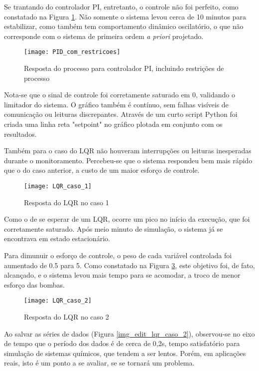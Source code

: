 Se trantando do controlador PI, entretanto, o controle não foi perfeito, como constatado na Figura \ref{img_pid_com_restricoes}. Não somente o sistema levou cerca de 10 minutos para estabilizar, como também tem comportamento dinâmico oscilatório, o que não corresponde com o sistema de primeira ordem \emph{a priori} projetado.

\begin{figure}[htb]
	\centering
	\caption{Resposta do processo para controlador PI, incluindo restrições de processo}
	\texttt{[image: PID\_com\_restricoes]}
	\label{img_pid_com_restricoes}
\end{figure}

Nota-se que o sinal de controle foi corretamente saturado em 0, validando o limitador do sistema. O gráfico também é contínuo, sem falhas visíveis de comunicação ou leituras discrepantes. Através de um curto script Python foi criada uma linha reta "setpoint" no gráfico plotada em conjunto com os resultados.

Também para o caso do LQR não houveram interrupções ou leituras inesperadas durante o monitoramento. Percebeu-se que o sistema respondeu bem mais rápido que o do caso anterior, a custo de um maior esforço de controle.

\begin{figure}[htb]
	\centering
	\caption{Resposta do LQR no caso 1}
	\texttt{[image: LQR\_caso\_1]}
	\label{img_lqr_caso_1}
\end{figure}

Como o de se esperar de um LQR, ocorre um pico no início da execução, que foi corretamente saturado. Após meio minuto de simulação, o sistema já se encontrava em estado estacionário.

Para dimunuir o esforço de controle, o peso de cada variável controlada foi aumentado de 0.5 para 5. Como constatado na Figura \ref{img_lqr_caso_2}, este objetivo foi, de fato, alcançado, e o sistema levou mais tempo para se acomodar, a troco de menor esforço das bombas.

\begin{figure}[htb]
	\centering
	\caption{Resposta do LQR no caso 2}
	\texttt{[image: LQR\_caso\_2]}
	\label{img_lqr_caso_2}
\end{figure}

Ao salvar as séries de dados (Figura \ref{img_edit_lqr_caso_2}), observou-se no eixo de tempo que o período dos dados é de cerca de 0,2s, tempo satisfatório para simulação de sistemas químicos, que tendem a ser lentos. Porém, em aplicações reais, isto é um ponto a se avaliar, se se tornará um problema.

